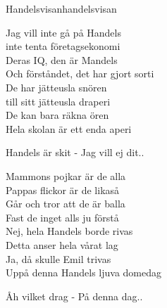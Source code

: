 \begin{song}{Handelsvisan}{handelsvisan}
\begin{vers}
Jag vill inte gå på Handels\\
inte tenta företagsekonomi\\
Deras IQ, den är Mandels\\
Och förståndet, det har gjort sorti\\
De har jätteusla snören\\
till sitt jätteusla draperi\\
De kan bara räkna ören\\
Hela skolan är ett enda aperi\\
\end{vers}
\begin{vers}
Handels är skit - Jag vill ej dit..\\
\end{vers}
\begin{vers}
Mammons pojkar är de alla\\
Pappas flickor är de likaså\\
Går och tror att de är balla\\
Fast de inget alls ju förstå\\
Nej, hela Handels borde rivas\\
Detta anser hela vårat lag\\
Ja, då skulle Emil trivas\\
Uppå denna Handels ljuva domedag\\
\end{vers}
\begin{vers}
Åh vilket drag - På denna dag..\\
\end{vers}
\end{song}